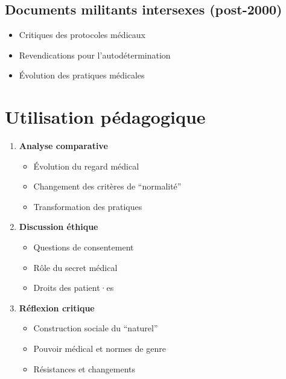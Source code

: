 \documentclass[
  letterpaper,
  DIV=11,
  numbers=noendperiod]{scrreprt}
\providecommand{\tightlist}{%
  \setlength{\itemsep}{0pt}\setlength{\parskip}{0pt}}\usepackage{longtable,booktabs,array}
\begin{document}
\subsection{Documents militants intersexes
(post-2000)}\label{documents-militants-intersexes-post-2000}

\begin{itemize}
\tightlist
\item
  Critiques des protocoles médicaux
\item
  Revendications pour l'autodétermination
\item
  Évolution des pratiques médicales
\end{itemize}

\section{Utilisation pédagogique}\label{utilisation-puxe9dagogique}

\begin{enumerate}
\def\labelenumi{\arabic{enumi}.}
\tightlist
\item
  \textbf{Analyse comparative}

  \begin{itemize}
  \tightlist
  \item
    Évolution du regard médical
  \item
    Changement des critères de ``normalité''
  \item
    Transformation des pratiques
  \end{itemize}
\item
  \textbf{Discussion éthique}

  \begin{itemize}
  \tightlist
  \item
    Questions de consentement
  \item
    Rôle du secret médical
  \item
    Droits des patient·es
  \end{itemize}
\item
  \textbf{Réflexion critique}

  \begin{itemize}
  \tightlist
  \item
    Construction sociale du ``naturel''
  \item
    Pouvoir médical et normes de genre
  \item
    Résistances et changements
  \end{itemize}
\end{enumerate}
\end{document}
